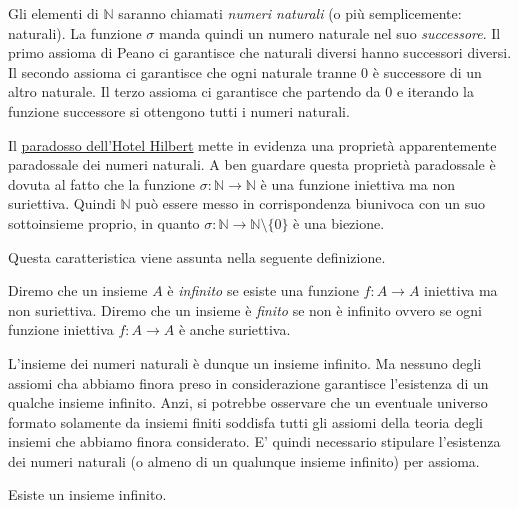 \documentclass[italian,a4paper,twosides,headinclude]{scrbook}
\newcommand{\NN}{\mathbb N}
\newcommand{\myhref}[2]{\href{#1}{\underline{#2}}}
\begin{document}
Gli elementi di $\NN$ saranno chiamati \emph{numeri naturali} (o più semplicemente: naturali).
La funzione $\sigma$ manda quindi un numero naturale nel suo \emph{successore}. Il primo assioma di Peano ci garantisce che naturali diversi hanno successori diversi. Il secondo assioma ci garantisce che ogni naturale tranne $0$ è successore di un altro naturale. Il terzo assioma ci garantisce che partendo da $0$ e iterando la funzione successore si ottengono tutti i numeri naturali.

Il \myhref{https://it.wikipedia.org/wiki/Paradosso_del_Grand_Hotel_di_Hilbert}{paradosso dell'Hotel Hilbert}
mette in evidenza una proprietà apparentemente paradossale dei numeri naturali. A ben guardare questa proprietà paradossale è
dovuta al fatto che la funzione $\sigma \colon \NN \to \NN$ è una funzione iniettiva ma non suriettiva. Quindi $\NN$ può essere messo in corrispondenza biunivoca con un suo sottoinsieme proprio, in quanto $\sigma \colon \NN \to \NN\setminus\{0\}$ è una biezione.

Questa caratteristica viene assunta nella seguente definizione.

\begin{definition}
Diremo che un insieme $A$ è \emph{infinito} se esiste una funzione $f\colon A \to A$ iniettiva ma non suriettiva. Diremo che un insieme è \emph{finito} se non è infinito ovvero se ogni funzione iniettiva $f\colon A \to A$ è anche suriettiva.
\end{definition}

L'insieme dei numeri naturali è dunque un insieme infinito. Ma nessuno degli assiomi cha abbiamo finora preso in considerazione garantisce l'esistenza di un qualche insieme infinito. Anzi, si potrebbe osservare che un eventuale universo formato solamente da insiemi finiti soddisfa tutti gli assiomi della teoria degli insiemi che abbiamo finora considerato. E' quindi necessario stipulare l'esistenza dei numeri naturali (o almeno di un qualunque insieme infinito) per assioma.

\begin{axiom}
Esiste un insieme infinito.
\end{axiom}
\end{document}
